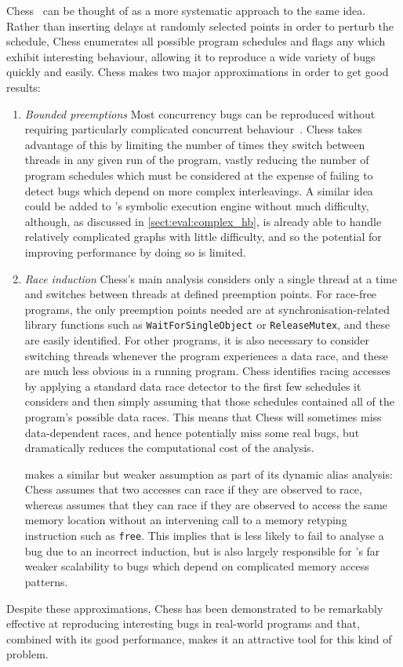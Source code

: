 Chess~\cite{Musuvathi2008} can be thought of as a more systematic
approach to the same idea.  Rather than inserting delays at randomly
selected points in order to perturb the schedule, Chess enumerates all
possible program schedules and flags any which exhibit interesting
behaviour, allowing it to reproduce a wide variety of bugs quickly and
easily.  Chess makes two major approximations in order to get good
results:
\begin{enumerate}
\item \emph{Bounded preemptions} Most concurrency bugs can be
  reproduced without requiring particularly complicated concurrent
  behaviour~\cite{Musuvathi2007}.  Chess takes advantage of this by
  limiting the number of times they switch between threads in any
  given run of the program, vastly reducing the number of program
  schedules which must be considered at the expense of failing to
  detect bugs which depend on more complex interleavings.  A similar
  idea could be added to {\technique}'s symbolic execution engine
  without much difficulty, although, as discussed in
  \autoref{sect:eval:complex_hb}, {\technique} is already able to
  handle relatively complicated graphs with little difficulty, and so
  the potential for improving performance by doing so is limited.
\item \emph{Race induction} Chess's main analysis considers only a
  single thread at a time and switches between threads at defined
  preemption points.  For race-free programs, the only preemption
  points needed are at synchronisation-related library functions such
  as \texttt{WaitForSingleObject} or \texttt{ReleaseMutex}, and these
  are easily identified.  For other programs, it is also necessary to
  consider switching threads whenever the program experiences a data
  race, and these are much less obvious in a running program.  Chess
  identifies racing accesses by applying a standard data race detector
  to the first few schedules it considers and then simply assuming
  that those schedules contained all of the program's possible data
  races.  This means that Chess will sometimes miss data-dependent
  races, and hence potentially miss some real bugs, but dramatically
  reduces the computational cost of the analysis.

  {\Technique} makes a similar but weaker assumption as part of its
  dynamic alias analysis: Chess assumes that two accesses can race if
  they are observed to race, whereas {\technique} assumes that they
  can race if they are observed to access the same memory location
  without an intervening call to a memory retyping instruction such as
  \texttt{free}.  This implies that {\technique} is less likely to
  fail to analyse a bug due to an incorrect induction, but is also
  largely responsible for {\technique}'s far weaker scalability to
  bugs which depend on complicated memory access patterns.
\end{enumerate}
Despite these approximations, Chess has been demonstrated to be
remarkably effective at reproducing interesting bugs in real-world
programs and that, combined with its good performance, makes it an
attractive tool for this kind of problem.

